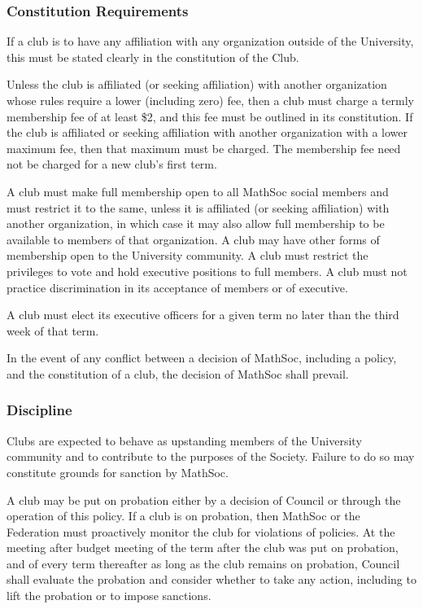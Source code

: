 \subsubsection{Constitution Requirements}
If a club is to have any affiliation with any organization outside of the
University, this must be stated clearly in the constitution of the Club.

Unless the club is affiliated (or seeking affiliation) with another organization
whose rules require a lower (including zero) fee, then a club must charge a
termly membership fee of at least \$2, and this fee must be outlined in its
constitution. If the club is affiliated or seeking affiliation with another
organization with a lower maximum fee, then that maximum must be charged. The
membership fee need not be charged for a new club's first term.

A club must make full membership open to all MathSoc social members and must
restrict it to the same, unless it is affiliated (or seeking affiliation) with
another organization, in which case it may also allow full membership to be
available to members of that organization. A club may have other forms of
membership open to the University community. A club must restrict the privileges
to vote and hold executive positions to full members. A club must not practice
discrimination in its acceptance of members or of executive.

A club must elect its executive officers for a given term no later than the
third week of that term.

In the event of any conflict between a decision of MathSoc, including a policy,
and the constitution of a club, the decision of MathSoc shall prevail.

\subsubsection{Discipline}
Clubs are expected to behave as upstanding members of the University community
and to contribute to the purposes of the Society. Failure to do so may
constitute grounds for sanction by MathSoc.

A club may be put on probation either by a decision of Council or through the
operation of this policy. If a club is on probation, then MathSoc or the
Federation must proactively monitor the club for violations of policies. At the
meeting after budget meeting of the term after the club was put on probation,
and of every term thereafter as long as the club remains on probation, Council
shall evaluate the probation and consider whether to take any action, including
to lift the probation or to impose sanctions.

